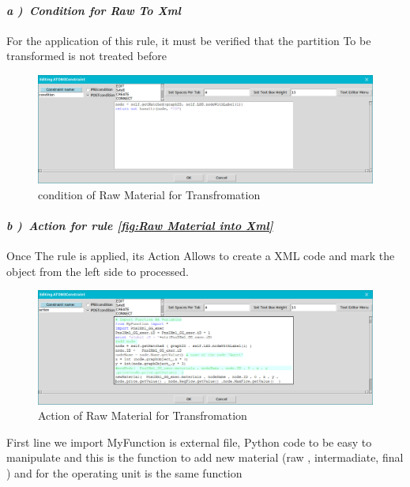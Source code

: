 \paragraph{\emph{ a )~Condition for Raw To Xml } } For the application of this rule, it must be verified that the partition To be transformed is not treated before
\vspace{1cm}
\begin{figure}[th]
	\centering %
 	\includegraphics[scale=0.38]{ch3/img/xcond1}
	\caption{\label{fig:condition of Raw Material for Transfromation}condition of Raw Material for Transfromation}
\end{figure}
\pagebreak
\paragraph{\emph{ b )~Action for rule \ref{fig:Raw Material into Xml} } } Once 
The rule is applied, its Action Allows to create a XML code and mark the object from the left side to processed. 
 
\begin{figure}[th]
	\centering %
 	\includegraphics[scale=0.38]{ch3/img/xact1}
	\caption{\label{fig:Action of Raw Material for Transfromation}Action of Raw Material for Transfromation}
\end{figure} 
First line we import MyFunction is external file, Python code 
to be easy to manipulate and this is the function to add new material (raw ,
intermadiate, final ) 
and for the operating unit is the same function
 
